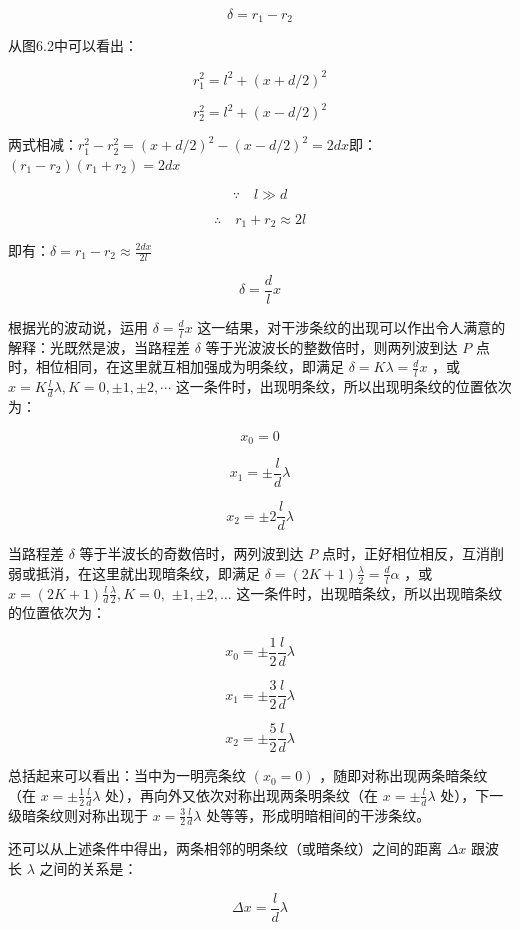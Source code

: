 \[
\delta = r _ {1} - r _ {2}
\]

从图6.2中可以看出：

\[
r _ {1} ^ {2} = l ^ {2} + (x + d / 2) ^ {2}
\]

\[
r _ {2} ^ {2} = l ^ {2} + (x - d / 2) ^ {2}
\]

两式相减：\(r_1^2 - r_2^2 = (x + d / 2)^2 - (x - d / 2)^2 = 2dx\)即：\((r_1 - r_2)(r_1 + r_2) = 2dx\)

\[
\because \quad l \gg d
\]

\[
\therefore \quad r _ {1} + r _ {2} \approx 2 l
\]

即有：\(\delta = r_{1} - r_{2}\approx \frac{2dx}{2l}\)

\[
\delta = \frac {d}{l} x
\]

根据光的波动说，运用 \(\delta = \frac{d}{l} x\)
这一结果，对干涉条纹的出现可以作出令人满意的解释：光既然是波，当路程差
\(\delta\) 等于光波波长的整数倍时，则两列波到达 \(P\)
点时，相位相同，在这里就互相加强成为明条纹，即满足
\(\delta = K\lambda = \frac{d}{l} x\) ，或
\(x = K\frac{l}{d}\lambda, K = 0, \pm 1, \pm 2, \cdots\)
这一条件时，出现明条纹，所以出现明条纹的位置依次为：

\[
x _ {0} = 0
\]

\[
x _ {1} = \pm \frac {l}{d} \lambda
\]

\[
x _ {2} = \pm 2 \frac {l}{d} \lambda
\]

当路程差 \(\delta\) 等于半波长的奇数倍时，两列波到达 \(P\)
点时，正好相位相反，互消削弱或抵消，在这里就出现暗条纹，即满足
\(\delta = (2K + 1)\frac{\lambda}{2} = \frac{d}{l}\alpha\) ，或
\(x = (2K + 1)\frac{l}{d}\frac{\lambda}{2}, K = 0,\)
\(\pm 1,\pm 2,\dots\)
这一条件时，出现暗条纹，所以出现暗条纹的位置依次为：

\[
x _ {0} = \pm \frac {1}{2} \frac {l}{d} \lambda
\]

\[
x _ {1} = \pm \frac {3}{2} \frac {l}{d} \lambda
\]

\[
x _ {2} = \pm \frac {5}{2} \frac {l}{d} \lambda
\]

总括起来可以看出：当中为一明亮条纹 \((x_{0}=0)\)
，随即对称出现两条暗条纹（在 \(x=\pm\frac{1}{2}\frac{l}{d}\lambda\)
处），再向外又依次对称出现两条明条纹（在 \(x=\pm\frac{l}{d}\lambda\)
处），下一级暗条纹则对称出现于 \(x=\frac{3}{2}\frac{l}{d}\lambda\)
处等等，形成明暗相间的干涉条纹。

还可以从上述条件中得出，两条相邻的明条纹（或暗条纹）之间的距离
\(\Delta x\) 跟波长 \(\lambda\) 之间的关系是：

\[
\Delta x = \frac {l}{d} \lambda
\]

